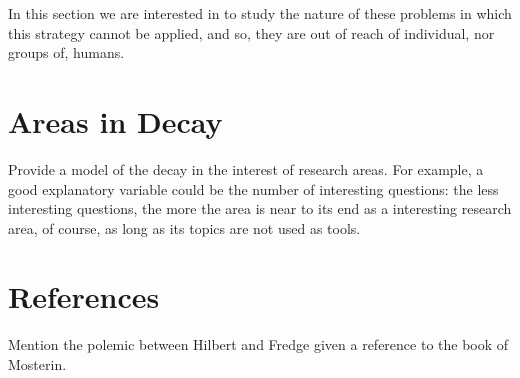 In this section we are interested in to study the nature of these problems in which this strategy cannot be applied, and so, they are out of reach of individual, nor groups of, humans.

%
%

\section{Areas in Decay}

{\color{red} Provide a model of the decay in the interest of research areas. For example, a good explanatory variable could be the number of interesting questions: the less interesting questions, the more the area is near to its end as a interesting research area, of course, as long as its topics are not used as tools.}

%
%

\section*{References}

{\color{red} Mention the polemic between Hilbert and Fredge given a reference to the book of Mosterin.}


